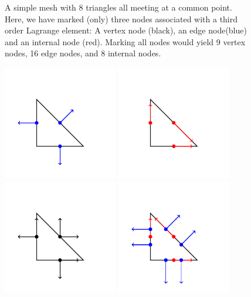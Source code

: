 \begin{figure}
\begin{tikzpicture}[scale=3]
\end{tikzpicture}
\label{fig:Lagrange8elements}
\caption{A simple mesh with 8 triangles all meeting at a common point. 
Here, we have marked (only) three nodes associated with a third order Lagrange element: A vertex node (black), an edge node(blue) and an internal node (red).  
Marking all nodes would yield 9 vertex nodes,  16 edge nodes, and 8 internal nodes.  }
\end{figure}






\begin{figure}
\begin{center}
\includegraphics[width=5cm]{chapters/element/rt.pdf}
\includegraphics[width=5cm]{chapters/element/nedlec.pdf}
\includegraphics[width=5cm]{chapters/element/cr.pdf}
\includegraphics[width=5cm]{chapters/element/mtw.pdf}

\end{center}
\end{figure}
